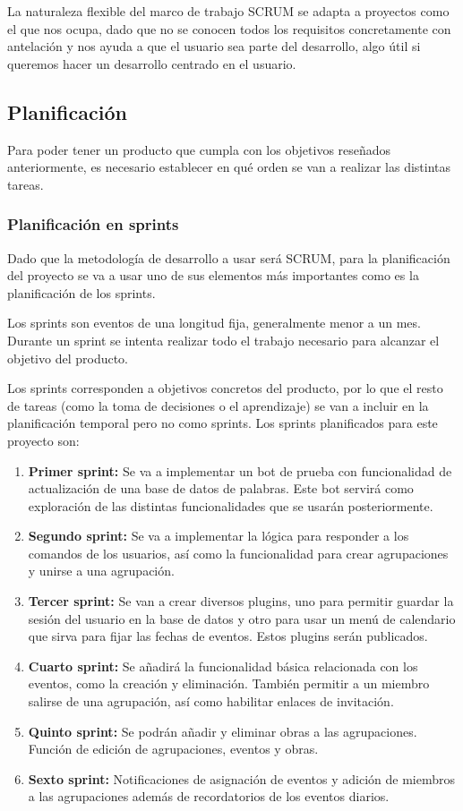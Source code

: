 La naturaleza flexible del marco de trabajo SCRUM se adapta a proyectos como el que nos ocupa, dado que no se conocen todos los requisitos concretamente con antelación y nos ayuda a que el usuario sea parte del desarrollo, algo útil si queremos hacer un desarrollo centrado en el usuario.

\subsection{Planificación}

Para poder tener un producto que cumpla con los objetivos reseñados anteriormente, es necesario establecer en qué orden se van a realizar las distintas tareas.


\subsubsection{Planificación en sprints}

Dado que la metodología de desarrollo a usar será SCRUM, para la planificación del proyecto se va a usar uno de sus elementos más importantes como es la planificación de los sprints. 

Los sprints son eventos de una longitud fija, generalmente menor a un mes. Durante un sprint se intenta realizar todo el trabajo necesario para alcanzar el objetivo del producto.

Los sprints corresponden a objetivos concretos del producto, por lo que el resto de tareas (como la toma de decisiones o el aprendizaje) se van a incluir en la planificación temporal pero no como sprints. Los sprints planificados para este proyecto son:

\begin{enumerate}

\item \textbf{Primer sprint:} Se va a implementar un bot de prueba con funcionalidad de actualización de una base de datos de palabras. Este bot servirá como exploración de las distintas funcionalidades que se usarán posteriormente.
\item \textbf{Segundo sprint:} Se va a implementar la lógica para responder a los comandos de los usuarios, así como la funcionalidad para crear agrupaciones y unirse a una agrupación.
\item \textbf{Tercer sprint:} Se van a crear diversos plugins, uno para permitir guardar la sesión del usuario en la base de datos y otro para usar un menú de calendario que sirva para fijar las fechas de eventos. Estos plugins serán publicados.
\item \textbf{Cuarto sprint:} Se añadirá la funcionalidad básica relacionada con los eventos, como la creación y eliminación. También permitir a un miembro salirse de una agrupación, así como habilitar enlaces de invitación.
\item \textbf{Quinto sprint:} Se podrán añadir y eliminar obras a las agrupaciones. Función de edición de agrupaciones, eventos y obras. 
\item \textbf{Sexto sprint:} Notificaciones de asignación de eventos y adición de miembros a las agrupaciones además de recordatorios de los eventos diarios.
\end{enumerate}

